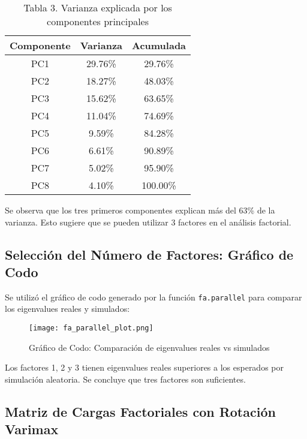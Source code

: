 \documentclass[12pt]{report}
\begin{document}
\begin{table}[H]
\centering
\begin{tabular}{|c|c|c|}
\hline
\textbf{Componente} & \textbf{Varianza} & \textbf{Acumulada} \\
\hline
PC1 & 29.76\% & 29.76\% \\
PC2 & 18.27\% & 48.03\% \\
PC3 & 15.62\% & 63.65\% \\
PC4 & 11.04\% & 74.69\% \\
PC5 & 9.59\% & 84.28\% \\
PC6 & 6.61\% & 90.89\% \\
PC7 & 5.02\% & 95.90\% \\
PC8 & 4.10\% & 100.00\% \\
\hline
\end{tabular}
\caption{Tabla 3. Varianza explicada por los componentes principales}
\end{table}

\noindent Se observa que los tres primeros componentes explican más del 63\% de la varianza. Esto sugiere que se pueden utilizar 3 factores en el análisis factorial.

\subsection{Selección del Número de Factores: Gráfico de Codo}
Se utilizó el gráfico de codo generado por la función \texttt{fa.parallel} para comparar los eigenvalues reales y simulados:

\begin{figure}[H]
    \centering
    \texttt{[image: fa\_parallel\_plot.png]}
    \caption{Gráfico de Codo: Comparación de eigenvalues reales vs simulados}
\end{figure}

\noindent Los factores 1, 2 y 3 tienen eigenvalues reales superiores a los esperados por simulación aleatoria. Se concluye que tres factores son suficientes.

\subsection{Matriz de Cargas Factoriales con Rotación Varimax}
\end{document}
